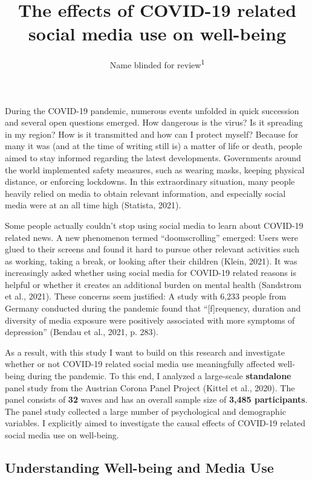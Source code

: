\documentclass[
  man,mask]{apa7}
\title{The effects of COVID-19 related social media use on well-being}
\author{Name blinded for review\textsuperscript{1}}
\date{}
\affiliation{\vspace{0.5cm}\textsuperscript{1} }
\begin{document}
\maketitle

During the COVID-19 pandemic,
numerous events unfolded in quick succession and several open questions emerged.
How dangerous is the virus?
Is it spreading in my region?
How is it transmitted and how can I protect myself?
Because for many it was (and at the time of writing still is) a matter of life or death, people aimed to stay informed regarding the latest developments.
Governments around the world implemented safety measures, such as wearing masks, keeping physical distance, or enforcing lockdowns.
In this extraordinary situation, many people heavily relied on media to obtain relevant information, and especially social media were at an all time high (Statista, 2021).

Some people actually couldn't stop using social media to learn about COVID-19 related news.
A new phenomenon termed ``doomscrolling'' emerged:
Users were glued to their screens and found it hard to pursue other relevant activities such as working, taking a break, or looking after their children (Klein, 2021).
It was increasingly asked whether using social media for COVID-19 related reasons is helpful or whether it creates an additional burden on mental health (Sandstrom et al., 2021).
These concerns seem justified:
A study with 6,233 people from Germany conducted during the pandemic found that ``{[}f{]}requency, duration and diversity of media exposure were positively associated with more symptoms of depression'' (Bendau et al., 2021, p. 283).

As a result, with this study I want to build on this research and investigate whether or not COVID-19 related social media use meaningfully affected well-being during the pandemic.
To this end, I analyzed a large-scale \textbf{standalone} panel study from the Austrian Corona Panel Project (Kittel et al., 2020).
The panel consists of \textbf{32} waves and has an overall sample size of \textbf{3,485 participants}.
The panel study collected a large number of psychological and demographic variables.
I explicitly aimed to investigate the causal effects of COVID-19 related social media use on well-being.

\hypertarget{understanding-well-being-and-media-use}{%
\subsection{Understanding Well-being and Media Use}\label{understanding-well-being-and-media-use}}
\end{document}

